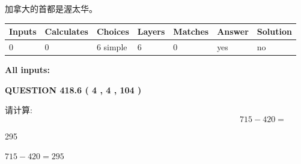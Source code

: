 \documentclass{ctexart}
\begin{document}
 
加拿大的首都是渥太华。
 
 
\noindent{}
 
 
   
   
   
   
\noindent\begin{tabular}{|l|l|l|l|l|l|l|}
 \hline
Inputs & Calculates & Choices & Layers & Matches & Answer & Solution \\ \hline
 0  & 
 0  & 
 6
  simple  
  & 
 6  & 
 0  & 
  yes & 
  no 
  \\ \hline
 \end{tabular}
   
   
   
   
\noindent{}
   
   
   
   
\noindent\vspace{0.1in}\hspace{-0.08in} {\textbf{\Large{All inputs: }}}
   
   
  
\vspace{0.2in}
  
{\textbf{\Large{QUESTION
418.6 
 ( 4 , 4 , 104 )
}}}
  
  
 
请计算:
\begin{equation}
715 -   %
420 = \nonumber
\end{equation}
 
 
 
\noindent{}
 
 

295
 
 
\noindent{}
 
 

 
 
 
\noindent{}
 
 

$ %
715 -  %
420=   %
295$
 
 
\noindent{}
 
\end{document}
